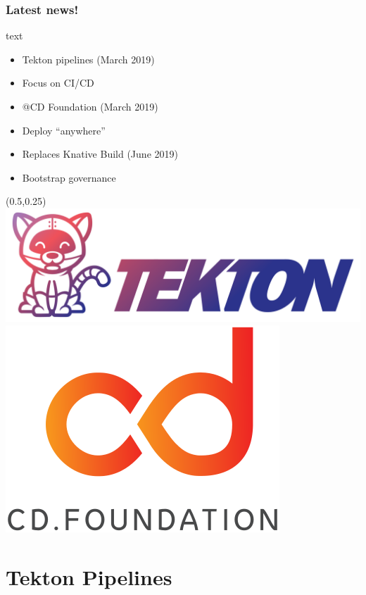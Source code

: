 \documentclass[aspectratio=169,11pt,hyperref={colorlinks=true}]{beamer}
\begin{document}
\begin{lblackrwhiteframe}
\begin{lblackrwhiteframe}
\begin{lblackrwhiteframe}
  \frametitle{Latest news!}
  \large
  \begin{beamercolorbox}[wd=0.35\paperwidth]{text}
    \begin{itemize}
      \item Tekton pipelines (March 2019)
      \item Focus on CI/CD
      \item @CD Foundation  (March 2019)
      \item Deploy ``anywhere''
      \item Replaces Knative Build (June 2019)
      \item Bootstrap governance
    \end{itemize}
  \end{beamercolorbox}%
  \begin{textblock*}{0.5\paperwidth}(0.5\paperwidth,0.25\paperheight)
    \centering
    \includegraphics[width=0.35\paperwidth]{img/tekton-horizontal-color.png}
    \includegraphics[width=0.20\paperwidth]{img/cdf-color.png}
  \end{textblock*}
\end{lblackrwhiteframe}

\section{Tekton Pipelines}


\end{lblackrwhiteframe}
\end{lblackrwhiteframe}
\end{document}
